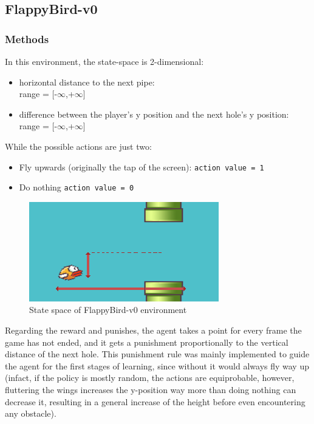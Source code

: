 \documentclass[11pt,a4paper,twocolumn]{IEEEtran}
\begin{document}
		\subsection{\textbf{FlappyBird-v0}}
			\subsubsection{\textbf{Methods}}
			In this environment, the state-space is 2-dimensional:
			\begin{itemize}
				\item horizontal distance to the next pipe:\\ range = [-$\infty$,+$\infty$]
				\item difference between the player's y position and the next hole's y position:\\ range = [-$\infty$,+$\infty$]
			\end{itemize}
			While the possible actions are just two:
			\begin{itemize}
				\item Fly upwards (originally the tap of the screen): \texttt{action value = 1}
				\item Do nothing \texttt{action value = 0}
			\end{itemize}
		
			\begin{figure}[h]
				\centering
				\includegraphics[width=0.75\linewidth]{../imgs/github1}
				\caption{State space of FlappyBird-v0 environment}
			\end{figure}
			Regarding the reward and punishes, the agent takes a point for every frame the game has not ended, and it gets a punishment proportionally to the vertical distance of the next hole. This punishment rule was mainly implemented to guide the agent for the first stages of learning, since without it would always fly way up (infact, if the policy is mostly random, the actions are equiprobable, however, fluttering the wings increases the y-position way more than doing nothing can decrease it, resulting in a general increase of the height before even encountering any obstacle).\medskip
		
\end{document}
